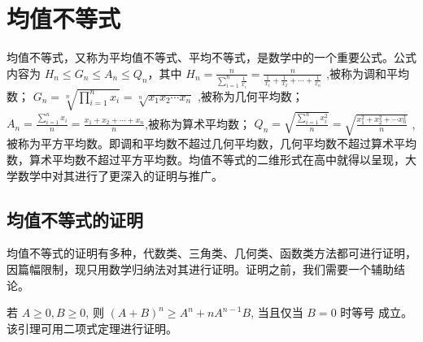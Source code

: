 \chapter{均值不等式}

均值不等式，又称为平均值不等式、平均不等式，是数学中的一个重要公式。公式内容为 $H_{n} \leq G_{n} \leq A_{n} \leq Q_{n}$，其中 $H_{n} = \frac{n}{\sum_{i = 1}^{n} \frac{1}{x_{i}}} = \frac{n}{\frac{1}{x_{1}} + \frac{1}{x_{2}} + \cdots + \frac{1}{x_{n}}}$ ,被称为调和平均数； $G_{n} = \sqrt[n]{\prod_{i = 1}^{n} x_{i}} = \sqrt[n]{x_{1} x_{2} \cdots x_{n}}$ ,被称为几何平均数； $A_{n} = \frac{\sum_{i = 1}^{n} x_{i}}{n}=  \frac{x_{1}+ x_{2} + \cdots + x_{n}}{n}$,被称为算术平均数； $Q_{n} = \sqrt{\frac{\sum_{i = 1}^{n} x_{i}^{2}}{n}} = \sqrt{\frac{x_{1}^{2} + x_{2}^{2} + \cdots x_{n}^{2}}{n}}$ ,被称为平方平均数。即调和平均数不超过几何平均数，几何平均数不超过算术平均数，算术平均数不超过平方平均数。均值不等式的二维形式在高中就得以呈现，大学数学中对其进行了更深入的证明与推广。



\section{均值不等式的证明}

均值不等式的证明有多种，代数类、三角类、几何类、函数类方法都可进行证明\parencite{贾静2017关于均值不等式的教学探究及应用}，因篇幅限制，现只用数学归纳法对其进行证明。证明之前，我们需要一个辅助结论。

\begin{lemma}
  若 $A \geq 0, B \geq 0$, 则 $(A+B)^{n} \geq A^{n}+n A^{n-1} B$, 当且仅当 $B=0$ 时等号 成立。该引理可用二项式定理进行证明。
\end{lemma}

